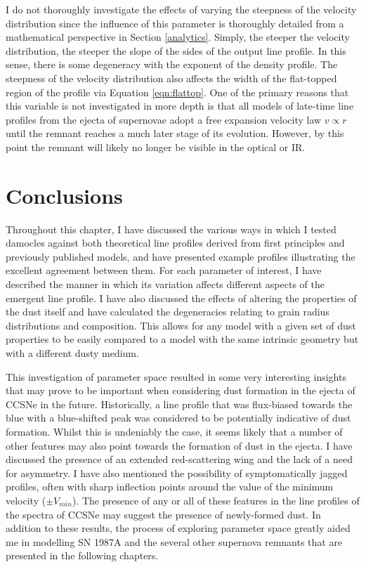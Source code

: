 \label{scn:vel_prof}

I do not thoroughly investigate the effects of varying the steepness of the velocity distribution since the influence of this parameter is thoroughly detailed from a mathematical perspective in Section \ref{analytics}.  Simply, the steeper the velocity distribution, the steeper the slope of the sides of the output line profile.  In this sense, there is some degeneracy with the exponent of the density profile.  The steepness of the velocity distribution also affects the width of the flat-topped region of the profile via Equation \ref{eqn:flattop}.  One of the primary reasons that this variable is not investigated in more depth is that all models of late-time line profiles from the ejecta of supernovae adopt a free expansion velocity law $v \propto r$ until the remnant reaches a much later stage of its evolution.  However, by this point the remnant will likely no longer be visible in the optical or IR.

\section{Conclusions}

Throughout this chapter, I have discussed the various ways in which I tested {\sc damocles} against both theoretical line profiles derived from first principles and previously published models, and have presented example profiles illustrating the excellent agreement between them.  For each parameter of interest, I have described the manner in which its variation affects different aspects of the emergent line profile.  I have also discussed the effects of altering the properties of the dust itself and have calculated the degeneracies relating to grain radius distributions and composition.  This allows for any model with a given set of dust properties to be easily compared to a model with the same intrinsic geometry but with a different dusty medium.  

This investigation of parameter space resulted in some very interesting insights that may prove to be important when considering dust formation in the ejecta of CCSNe in the future.  Historically,  a line profile that was flux-biased towards the blue with a blue-shifted peak was considered to be potentially indicative of dust formation.  Whilst this is undeniably the case, it seems likely that a number of other features may also point towards the formation of dust in the ejecta.  I have discussed the presence of an extended red-scattering wing and the lack of a need for asymmetry.  I have also mentioned the possibility of symptomatically jagged profiles, often with sharp inflection points around the value of the minimum velocity ($\pm V_{min}$).  The presence of any or all of these features in the line profiles of the spectra of CCSNe may suggest the presence of newly-formed dust.  In addition to these results, the process of exploring parameter space greatly aided me in modelling SN 1987A and the several other supernova remnants that are presented in the following chapters.





